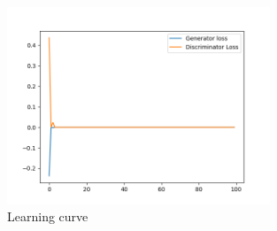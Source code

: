 \documentclass[a4paper]{article}
\theoremstyle{definition}
\newenvironment{soln}{
	\leavevmode\color{blue}\ignorespaces
}{}
\begin{document}
\begin{enumerate} [label=(\alph*)]
		\begin{soln}
			\begin{figure}[H]
				\centering
				\includegraphics[width=0.7\textwidth]{../figs/new_loss_loss.png}
				\caption{Learning curve}
				\label{fig:q2_loss}
			\end{figure}
			

\end{soln}
\end{enumerate}
\end{document}
